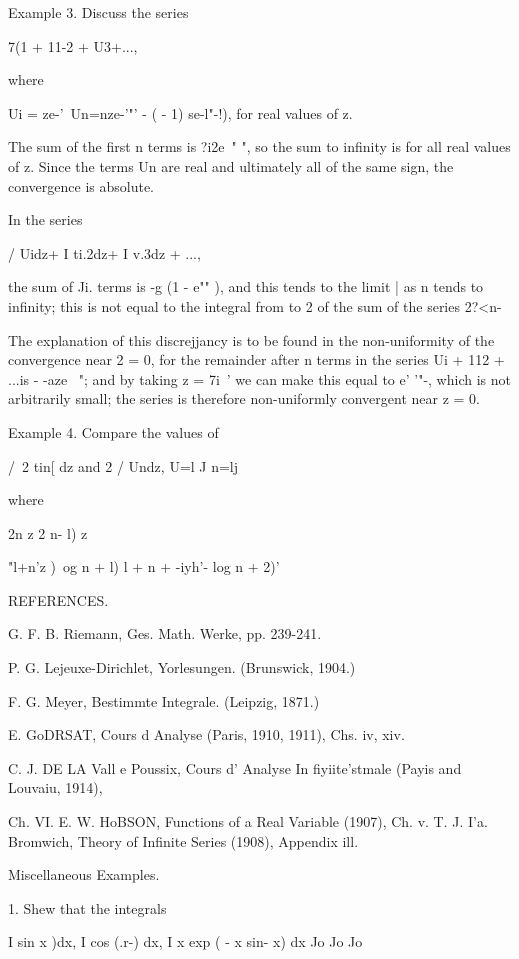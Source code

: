 Example 3. Discuss the series

7(1 + 11-2 + U3+...,

where

Ui = ze-'\ Un=nze-'"' - ( - 1) se-l"-!), for real values of z.

The sum of the first n terms is ?i2e~" ", so the sum to infinity is
for all real values of z. Since the terms Un are real and ultimately
all of the same sign, the convergence is absolute.

In the series

/ Uidz+ I ti.2dz+ I v.3dz + ...,

the sum of Ji. terms is -g (1 - e"" ), and this tends to the limit |
as n tends to infinity; this is not equal to the integral from to 2
of the sum of the series 2?<n-

The explanation of this discrejjancy is to be found in the
non-uniformity of the convergence near 2 = 0, for the remainder after
n terms in the series Ui + 112 + ...is - -aze~ "; and by taking z =
7i~' we can make this equal to e' '"-, which is not arbitrarily small;
the series is therefore non-uniformly convergent near z = 0.

Example 4. Compare the values of

/\ 2 tin[ dz and 2 / Undz, U=l J n=lj

where

2n z 2 n- l) z

"l+n'z )\ og n + l) l + n + -iyh'- log n + 2)'


REFERENCES.

G. F. B. Riemann, Ges. Math. Werke, pp. 239-241.

P. G. Lejeuxe-Dirichlet, Yorlesungen. (Brunswick, 1904.)

F. G. Meyer, Bestimmte Integrale. (Leipzig, 1871.)

E. GoDRSAT, Cours d Analyse (Paris, 1910, 1911), Chs. iv, xiv.

C. J. DE LA Vall e Poussix, Cours d' Analyse In fiyiite'stmale (Payis
and Louvaiu, 1914),

Ch. VI. E. W. HoBSON, Functions of a Real Variable (1907), Ch. v. T.
J. I'a. Bromwich, Theory of Infinite Series (1908), Appendix ill.

%
%

Miscellaneous Examples.

1. Shew that the integrals

I sin x )dx, I cos (.r-) dx, I x exp ( - x sin- x) dx Jo Jo Jo

